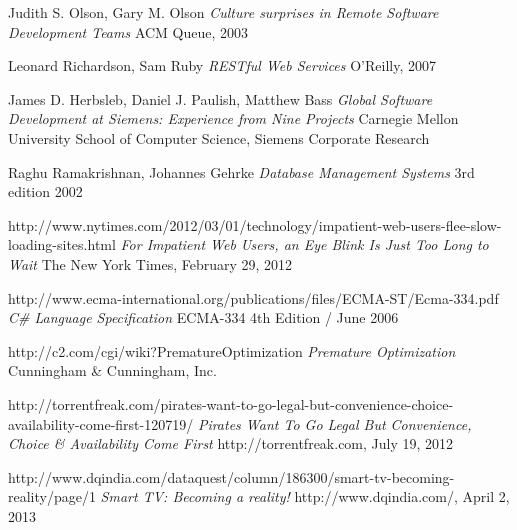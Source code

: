 \begin{thebibliography}{9}

		Judith S. Olson, Gary M. Olson\newline
		\emph{Culture surprises in Remote Software Development Teams}\newline
		ACM Queue, 2003

		Leonard Richardson, Sam Ruby\newline
		\emph{RESTful Web Services}
		O'Reilly, 2007
    
		James D. Herbsleb, Daniel J. Paulish, Matthew Bass\newline
		\emph{Global Software Development at Siemens: Experience from Nine Projects}
		Carnegie Mellon University School of Computer Science,
		Siemens Corporate Research 
	
		Raghu Ramakrishnan, Johannes Gehrke\newline
		\emph{Database Management Systems}\newline
		3rd edition 2002

		http://www.nytimes.com/2012/03/01/technology/impatient-web-users-flee-slow-loading-sites.html\newline
		\emph{For Impatient Web Users, an Eye Blink Is Just Too Long to Wait}\newline
		The New York Times, February 29, 2012

		http://www.ecma-international.org/publications/files/ECMA-ST/Ecma-334.pdf\newline
		\emph{C\# Language Specification }\newline
		ECMA-334 4th Edition / June 2006

		http://c2.com/cgi/wiki?PrematureOptimization\newline
		\emph{Premature Optimization}\newline
		Cunningham \& Cunningham, Inc.

		http://torrentfreak.com/pirates-want-to-go-legal-but-convenience-choice-availability-come-first-120719/\newline
		\emph{Pirates Want To Go Legal But Convenience, Choice \& Availability Come First}\newline
		http://torrentfreak.com, July 19, 2012

		http://www.dqindia.com/dataquest/column/186300/smart-tv-becoming-reality/page/1\newline
		\emph{Smart TV: Becoming a reality!}\newline
		http://www.dqindia.com/, April 2, 2013


\end{thebibliography}
